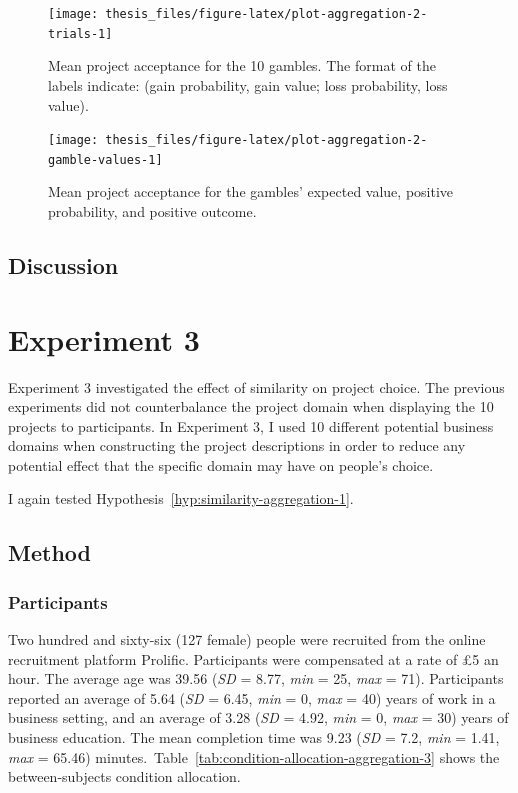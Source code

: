 \documentclass[a4paper, nobind, dvipsnames]{templates/ociamthesis}
\theoremstyle{definition}
\theoremstyle{definition}
\theoremstyle{definition}
\theoremstyle{definition}
\theoremstyle{remark}
\begin{document}
\begin{figure}
\texttt{[image: thesis\_files/figure-latex/plot-aggregation-2-trials-1]} \caption{Mean project acceptance for the 10 gambles. The format of the labels indicate: (gain probability, gain value; loss probability, loss value).}\label{fig:plot-aggregation-2-trials}
\end{figure}



\begin{figure}
\texttt{[image: thesis\_files/figure-latex/plot-aggregation-2-gamble-values-1]} \caption{Mean project acceptance for the gambles' expected value, positive probability, and positive outcome.}\label{fig:plot-aggregation-2-gamble-values}
\end{figure}

\hypertarget{discussion-6}{%
\subsection{Discussion}\label{discussion-6}}

\hypertarget{aggregation-3}{%
\section{Experiment 3}\label{aggregation-3}}

Experiment 3 investigated the effect of similarity on project choice. The
previous experiments did not counterbalance the project domain when displaying
the 10 projects to participants. In Experiment 3, I used 10 different potential
business domains when constructing the project descriptions in order to reduce
any potential effect that the specific domain may have on people's choice.

I again tested Hypothesis~\ref{hyp:similarity-aggregation-1}.

\hypertarget{method-8}{%
\subsection{Method}\label{method-8}}

\hypertarget{participants-9}{%
\subsubsection{Participants}\label{participants-9}}

Two hundred and sixty-six (127 female) people were recruited from the online recruitment platform Prolific. Participants were compensated at a rate of £5 an hour. The average age was 39.56 (\emph{SD} = 8.77, \emph{min} = 25, \emph{max} = 71). Participants reported an average of 5.64 (\emph{SD} = 6.45, \emph{min} = 0, \emph{max} = 40) years of work in a business setting, and an average of 3.28 (\emph{SD} = 4.92, \emph{min} = 0, \emph{max} = 30) years of business education. The mean completion time was 9.23 (\emph{SD} = 7.2, \emph{min} = 1.41, \emph{max} = 65.46) minutes.~Table~\ref{tab:condition-allocation-aggregation-3}
shows the between-subjects condition allocation.
\end{document}
